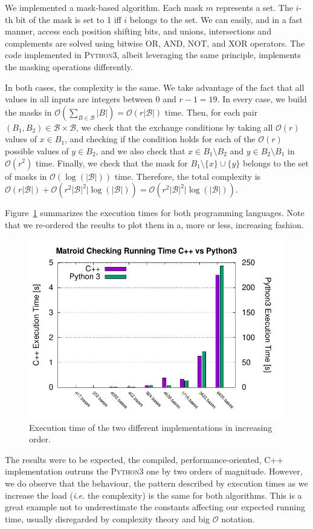 \documentclass[11pt]{amsart}
\begin{document}
We implemented a mask-based algorithm.
Each mask $m$ represents a set.
The $i$-th bit of the mask is set to 1 iff $i$ belongs to the set.
We can easily, and in a fast manner, access each position shifting bits, and unions, intersections and complements are solved using bitwise OR, AND, NOT, and XOR operators.
The code implemented in \textsc{Python3}, albeit leveraging the same principle, implements the masking operations differently.
 
In both cases, the complexity is the same. We take advantage of the fact that all values in all inputs are integers between $0$ and $r - 1 = 19$. In every case, we build the masks in $\mathcal{O}(\sum_{B \in \mathcal{B}} |B|) = \mathcal{O}(r|\mathcal{B}|)$ time. Then, for each pair $(B_1, B_2) \in \mathcal{B} \times \mathcal{B}$, we check that the exchange conditions by taking all $\mathcal{O}(r)$ values of $x \in B_1$, and checking if the condition holds for each of the $\mathcal{O}(r)$ possible values of $y \in B_2$, and we also check that $x \in B_1 \setminus B_2$ and $y \in B_2 \setminus B_1$ in $\mathcal{O}(r^2)$ time. Finally, we check that the mask for $B_1 \setminus \{x\} \cup \{y\}$ belongs to the set of masks in $\mathcal{O}(\log(|\mathcal{B}|))$ time. Therefore, the total complexity is $\mathcal{O}(r |\mathcal{B}|) + \mathcal{O}(r^2 |\mathcal{B}|^2| \log(|\mathcal{B}|)) =  \mathcal{O}(r^2 |\mathcal{B}|^2| \log(|\mathcal{B}|))$.

Figure~\ref{fig:team-bearland-times} summarizes the execution times for both programming languages.
Note that we re-ordered the results to plot them in a, more or less, increasing fashion. 
\begin{figure}[h!]
    \centering
    \includegraphics[width=.7\textwidth]{./team-berland/exec_time.pdf}
    \caption{Execution time of the two different implementations in increasing order.\label{fig:team-bearland-times}}
\end{figure}
The results were to be expected, the compiled, performance-oriented, \textsc{C++} implementation outruns the \textsc{Python3} one by two orders of magnitude.
However, we do observe that the behaviour, the pattern described by execution times as we increase the load (\textit{i.e.} the complexity) is the same for both algorithms.
This is a great example not to underestimate the constants affecting our expected running time, usually disregarded by complexity theory and big $\mathcal{O}$ notation.
\end{document}
